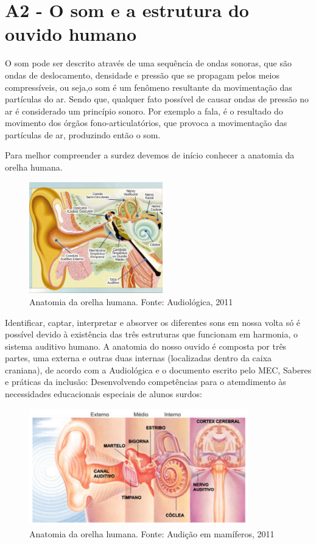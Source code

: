 \documentclass[brasil]{abnt}
\begin{document}
\chapter*{A2 - O som e a estrutura do ouvido humano}
			O som pode ser descrito através de uma sequência de ondas sonoras, que são ondas de deslocamento, densidade e pressão que se propagam pelos meios compressíveis, ou seja,o som é um fenômeno resultante 
			da movimentação das partículas do ar. Sendo que, qualquer fato possível de causar ondas de pressão no ar é considerado um princípio sonoro.	Por exemplo a fala, é o resultado do movimento dos órgãos 
			fono-articulatórios, que provoca a movimentação das partículas de ar, produzindo então o som.
			
			Para melhor compreender a surdez devemos de início conhecer a anatomia da orelha humana.
				\begin{figure}[h]
					\center
					\includegraphics[width=58mm]{aa.png}
					\caption{Anatomia da orelha humana. Fonte: Audiológica, 2011}
				\end{figure}
			
			Identificar, captar, interpretar e absorver os diferentes sons em nossa volta só é possível devido à existência das três estruturas que funcionam em harmonia, o sistema auditivo humano.
			A anatomia do nosso ouvido é composta por três partes, uma externa e outras duas internas (localizadas dentro da caixa craniana), de acordo com a Audiológica e o documento escrito pelo MEC, 
			Saberes e práticas da inclusão: Desenvolvendo competências para o atemdimento às necessidades educacionais especiais de alunos surdos:
			
				\begin{figure}[!htb]
					\center
					\includegraphics[width=95mm]{aa2.png}
					\caption{Anatomia da orelha humana. Fonte: Audição em mamíferos, 2011}
				\end{figure}
				
\end{document}
